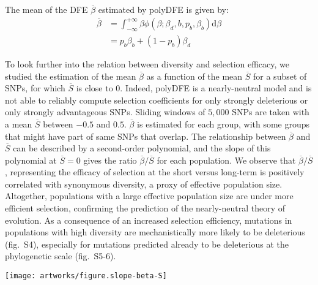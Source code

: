 \documentclass{article}
\newcommand{\der}{\mathrm{d}}
\newcommand{\Sphy}{S}
\newcommand{\SphyMean}{\overline{\Sphy}}
\newcommand{\Spop}{\beta}
\newcommand{\SpopMean}{\overline{\Spop}}
\begin{document}
    The mean of the DFE $\SpopMean$ estimated by polyDFE is given by:
    \begin{align*}
        \SpopMean & = \int_{-\infty}^{+\infty} \Spop \phi \left( \Spop; \Spop_d , b, p_b, \Spop_b \right) \der \Spop \\
        & =  p_b \Spop_b + \left( 1 - p_b \right) \Spop_d
    \end{align*}

    To look further into the relation between diversity and selection efficacy, we studied the estimation of the mean $\SpopMean$ as a function of the mean $\SphyMean$ for a subset of SNPs, for which $\SphyMean$ is close to $0$.
    Indeed, polyDFE is a nearly-neutral model and is not able to reliably compute selection coefficients for only strongly deleterious or only strongly advantageous SNPs.
    Sliding windows of $5,000$ SNPs are taken with a mean $\SphyMean$ between $-0.5$ and $0.5$.
    $\SpopMean$ is estimated for each group, with some groups that might have part of same SNPs that overlap.
    The relationship between $\SpopMean$ and $\SphyMean$ can be described by a second-order polynomial, and the slope of this polynomial at $\SphyMean=0$ gives the ratio $\SpopMean/\SphyMean$ for each population.
    We observe that $\SpopMean/\SphyMean$, representing the efficacy of selection at the short versus long-term is positively correlated with synonymous diversity, a proxy of effective population size.
    Altogether, populations with a large effective population size are under more efficient selection, confirming the prediction of the nearly-neutral theory of evolution.
    As a consequence of an increased selection efficiency, mutations in populations with high diversity are mechanistically more likely to be deleterious (fig.~S4), especially for mutations predicted already to be deleterious at the phylogenetic scale (fig.~S5-6).

    \begin{center}
        \texttt{[image: artworks/figure.slope-beta-S]}
    \end{center}

    

\end{document}
